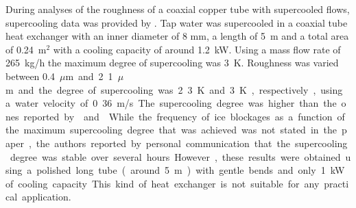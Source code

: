 During analyses of the  roughness of a coaxial copper tube with supercooled flows, supercooling data was provided by \cite{ernst_influence_2016}. 
Tap water was supercooled in a coaxial tube heat exchanger with an inner diameter of 8 mm, a length of 5~m and a total area of 0.24~m$^2$ with a  cooling capacity of around 1.2~kW.
Using a mass flow rate of 265~kg/h the maximum degree of supercooling was 3~K.
Roughness was varied between 0.4~\si{$\mu$m} and 2.1~\si{$\mu$m} and the degree of supercooling was 2.3~K and 3~K, respectively, using a water velocity of 0.36~m/s.
The supercooling degree was higher than the ones reported by \cite{bedecarrats_ice_2010} and \cite{castaing-lasvignottes_dynamic_2006}.
While the frequency of ice blockages as a function of the maximum supercooling degree that was achieved was not stated in the paper, the authors reported by personal communication that the supercooling degree was stable over several hours. 
However, these results were obtained using a polished long tube (around 5~m) with gentle bends and only 1~kW of cooling capacity. This kind of heat exchanger is not suitable for any practical application.



